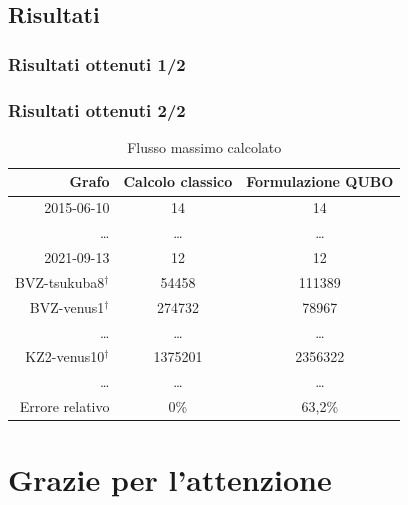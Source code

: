\documentclass[10pt]{beamer}
\begin{document}
\subsection{Risultati}
\begin{frame}
  \frametitle{Risultati ottenuti 1/2}

  \begin{table}
    \caption{Tempi d'esecuzione}\label{tabella_tempi}
    \centering
\end{table}

\end{frame}

\begin{frame}
  \frametitle{Risultati ottenuti 2/2}

  \begin{table}
    \caption{Flusso massimo calcolato}\label{tabella_valori}
    \centering
    \begin{tabular}{|r|c|c|}
    \hline
        Grafo & Calcolo classico & Formulazione QUBO \\ \hline
        2015-06-10 & 14 & 14 \\ \hline
        \dots & \dots & \dots \\ \hline
        2021-09-13 & 12 & 12 \\ \hline\hline
        BVZ-tsukuba8$^\dagger$ & 54458 & 111389 \\ \hline
        BVZ-venus1$^\dagger$ & 274732 & 78967 \\ \hline
        \dots & \dots & \dots \\ \hline
        KZ2-venus10$^\dagger$ & 1375201 & 2356322 \\ \hline
        \dots & \dots & \dots \\ \hline\hline
        Errore relativo & 0\% & 63,2\% \\ \hline %
    \end{tabular}
\end{table}

\end{frame}

\section*{Grazie per l'attenzione}
\end{document}

